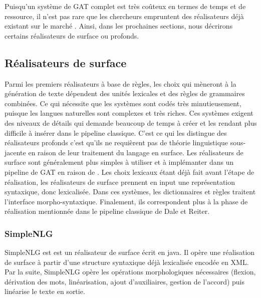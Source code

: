 Puisqu'un système de \ac{GAT} complet est très coûteux en termes de temps et de ressource, il n'est pas rare que les chercheurs empruntent des réalisateurs déjà existant sur le marché \citep{EssersChoosingSurfaceRealiser1998}. Ainsi, dans les prochaines sections, nous décrirons certains réalisateurs de surface ou profonds.



\subsection{Réalisateurs de surface}

Parmi les premiers réalisateurs à base de règles, les choix qui mèneront à la génération de texte dépendent des unités lexicales et des règles de grammaires combinées. Ce qui nécessite que les systèmes sont codés très minutieusement, puisque les langues naturelles sont complexes et très riches. Ces systèmes exigent des niveaux de détails qui demande beaucoup de temps à créer et les rendant plus difficile à insérer dans le pipeline classique. C'est ce qui les distingue des réalisateurs profonds c'est qu'ils ne requièrent pas de théorie linguistique sous-jacente en raison de leur traitement du langage en surface. Les réalisateurs de surface sont généralement plus simples à utiliser et à implémanter dans un pipeline de \ac{GAT} \citep{gatt18} en raison de . Les choix lexicaux étant déjà fait avant l'étape de réalisation, les réalisateurs de surface prennent en input une représentation syntaxique, donc lexicalisée. Dans ces systèmes, les dictionnaires et règles traitent l'interface morpho-syntaxique. Finalement, ils correspondent plus à la phase de réalisation mentionnée dans le pipeline classique de Dale et Reiter.

\subsubsection{SimpleNLG}
SimpleNLG est \citep{GattSimpleNLGRealisationEngine2009} est un réalisateur de surface écrit en java. Il opère une réalisation de surface à partir d'une structure syntaxique déjà lexicalisée encodée en XML. Par la suite, SimpleNLG opère les opérations morphologiques nécessaires (flexion, dérivation des mots, linéarisation, ajout d'auxiliaires, gestion de l'accord) puis linéarise le texte en sortie.


